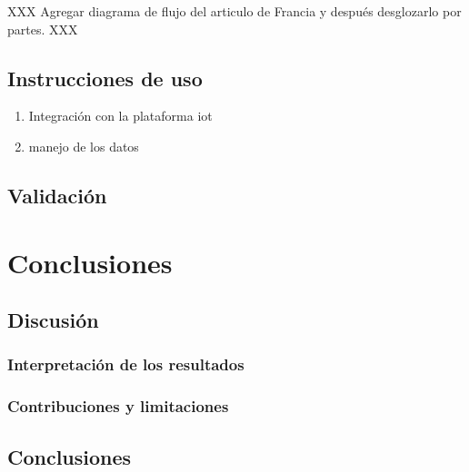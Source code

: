\documentclass[
  letterpaper,
  DIV=11,
  numbers=noendperiod]{scrreport}
\providecommand{\tightlist}{%
  \setlength{\itemsep}{0pt}\setlength{\parskip}{0pt}}\usepackage{longtable,booktabs,array}
\begin{document}
XXX Agregar diagrama de flujo del articulo de Francia y después
desglozarlo por partes. XXX

\hypertarget{sec-instrucciones}{%
\section{Instrucciones de uso}\label{sec-instrucciones}}

\begin{enumerate}
\def\labelenumi{\arabic{enumi}.}
\tightlist
\item
  Integración con la plataforma iot
\item
  manejo de los datos
\end{enumerate}

\hypertarget{sec-validaciuxf3n}{%
\section{Validación}\label{sec-validaciuxf3n}}


\hypertarget{conclusiones}{%
\chapter{Conclusiones}\label{conclusiones}}

\hypertarget{discusiuxf3n}{%
\section{Discusión}\label{discusiuxf3n}}

\hypertarget{interpretaciuxf3n-de-los-resultados}{%
\subsection{Interpretación de los
resultados}\label{interpretaciuxf3n-de-los-resultados}}

\hypertarget{contribuciones-y-limitaciones}{%
\subsection{Contribuciones y
limitaciones}\label{contribuciones-y-limitaciones}}

\hypertarget{conclusiones-1}{%
\section{Conclusiones}\label{conclusiones-1}}
\end{document}
